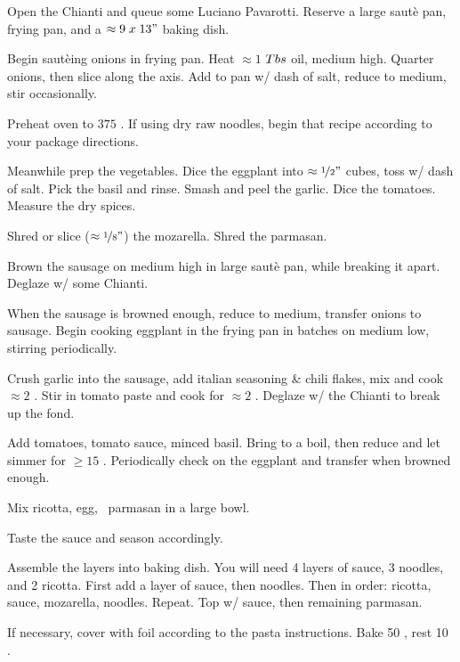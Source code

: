 \begin{preparation}
\item Open the Chianti and queue some Luciano Pavarotti.
	Reserve a large saut\`{e} pan, frying pan, and a $\approx 9\; x\; 13"$ baking dish.

\item Begin saut\`{e}ing onions in frying pan.
	Heat $\approx 1$ $Tbs$ oil, medium high.
	Quarter onions, then slice along the axis.
	Add to pan w/ dash of salt, reduce to medium, stir occasionally.

\item Preheat oven to $375$ \Fahrenheit.
	If using dry raw noodles, begin that recipe according to your package directions.

\item Meanwhile prep the vegetables.
	Dice the eggplant into $\approx \nicefrac{1}{2} "$ cubes, toss w/ dash of salt.
	Pick the basil and rinse.
	Smash and peel the garlic.
	Dice the tomatoes.
	Measure the dry spices.

\item Shred or slice ($\approx \nicefrac{1}{8} "$) the mozarella.
	Shred the parmasan.

\item Brown the sausage on medium high in large saut\`{e} pan, while breaking it apart.
	Deglaze w/ some Chianti.

\item When the sausage is browned enough, reduce to medium, transfer onions to sausage.
	Begin cooking eggplant in the frying pan in batches on medium low, stirring periodically.

\item Crush garlic into the sausage, add italian seasoning \& chili flakes, mix and cook $\approx 2$ \minute.
	Stir in tomato paste and cook for $\approx 2$ \minute.
	Deglaze w/ the Chianti to break up the fond.

\item Add tomatoes, tomato sauce, minced basil.
	Bring to a boil, then reduce and let simmer for $\geq 15$ \minute.
	Periodically check on the eggplant and transfer when browned enough.

\item Mix ricotta, egg, \onehalf~parmasan in a large bowl.

\item Taste the sauce and season accordingly.

\item Assemble the layers into baking dish.
	You will need 4 layers of sauce, 3 noodles, and 2 ricotta.
	First add a layer of sauce, then noodles.
	Then in order: ricotta, sauce, mozarella, noodles.
	Repeat.
	Top w/ sauce, then remaining parmasan.

\item If necessary, cover with foil according to the pasta instructions.
	Bake 50 \minute, rest 10 \minute.
\end{preparation}


